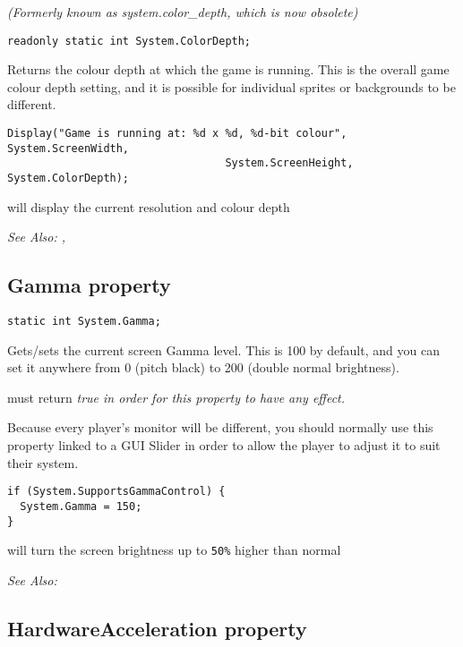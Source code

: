 \it{(Formerly known as system.color_depth, which is now obsolete)}

\begin{verbatim}
readonly static int System.ColorDepth;
\end{verbatim}
Returns the colour depth at which the game is running. This is the overall game colour depth setting,
and it is possible for individual sprites or backgrounds to be different.

\begin{verbatim}
Display("Game is running at: %d x %d, %d-bit colour", System.ScreenWidth,
                                  System.ScreenHeight, System.ColorDepth);
\end{verbatim}
will display the current resolution and colour depth

\it{See Also:} ,


\subsection{Gamma property}\label{System.Gamma}%

\begin{verbatim}
static int System.Gamma;
\end{verbatim}
Gets/sets the current screen Gamma level. This is 100 by default, and you can set it anywhere from 0 (pitch black)
to 200 (double normal brightness).

 must return \it{true}
in order for this property to have any effect.

Because every player's monitor will be different, you should normally use this property linked to a GUI Slider
in order to allow the player to adjust it to suit their system.

\begin{verbatim}
if (System.SupportsGammaControl) {
  System.Gamma = 150;
}
\end{verbatim}
will turn the screen brightness up to \verb$50%$ higher than normal

\it{See Also:} 


\subsection{HardwareAcceleration property}\label{System.HardwareAcceleration}%

